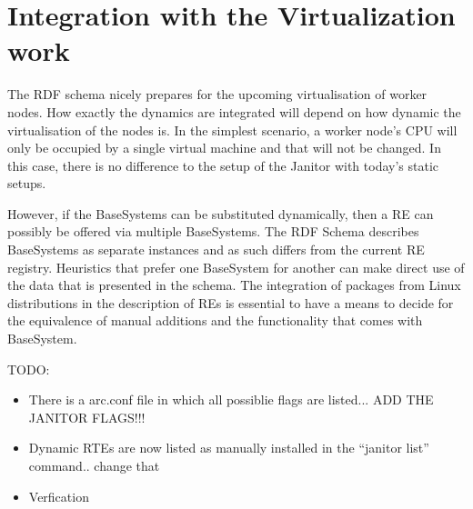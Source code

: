 \section{Integration with the Virtualization work}

The RDF schema nicely prepares for the upcoming virtualisation of worker
nodes.  How exactly the dynamics are integrated will depend on how
dynamic the virtualisation of the nodes is. In the simplest scenario,
a worker node's CPU will only be occupied by a single virtual machine
and that will not be changed. In this case, there is no difference to
the setup of the Janitor with today's static setups.

However, if the BaseSystems can be substituted dynamically, then a RE
can possibly be offered via multiple BaseSystems. The RDF
Schema describes BaseSystems as separate instances and as such differs
from the current RE registry.  Heuristics that prefer one BaseSystem for
another can make direct use of the data that is presented in the schema.
The integration of packages from Linux distributions in the description
of REs is essential to have a means to decide for the equivalence of
manual additions and the functionality that comes with BaseSystem.


TODO:\\
\begin{itemize}
 \item There is a arc.conf file in which all possiblie flags are listed... ADD THE JANITOR FLAGS!!!
 \item Dynamic RTEs are now listed as manually installed in the ``janitor list'' command.. change that
 \item Verfication
\end{itemize}
